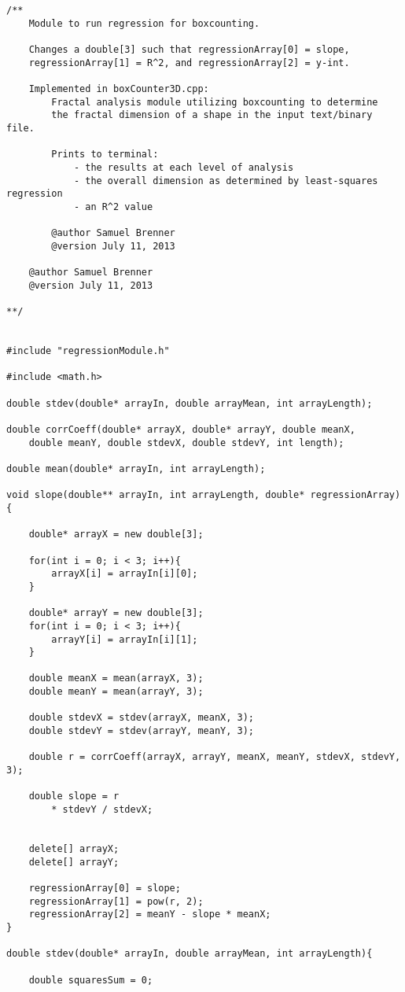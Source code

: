 \begin{lstlisting}
/**
	Module to run regression for boxcounting.
	
	Changes a double[3] such that regressionArray[0] = slope,
	regressionArray[1] = R^2, and regressionArray[2] = y-int.

	Implemented in boxCounter3D.cpp:
		Fractal analysis module utilizing boxcounting to determine 
		the fractal dimension of a shape in the input text/binary file.

		Prints to terminal:
			- the results at each level of analysis
			- the overall dimension as determined by least-squares regression
			- an R^2 value
			
		@author Samuel Brenner
		@version July 11, 2013

	@author Samuel Brenner
	@version July 11, 2013

**/


#include "regressionModule.h"

#include <math.h>

double stdev(double* arrayIn, double arrayMean, int arrayLength);

double corrCoeff(double* arrayX, double* arrayY, double meanX, 
	double meanY, double stdevX, double stdevY, int length);

double mean(double* arrayIn, int arrayLength);

void slope(double** arrayIn, int arrayLength, double* regressionArray){
	
	double* arrayX = new double[3];

	for(int i = 0; i < 3; i++){
		arrayX[i] = arrayIn[i][0];
	}

	double* arrayY = new double[3];
	for(int i = 0; i < 3; i++){
		arrayY[i] = arrayIn[i][1];
	}

	double meanX = mean(arrayX, 3);
	double meanY = mean(arrayY, 3);

	double stdevX = stdev(arrayX, meanX, 3);
	double stdevY = stdev(arrayY, meanY, 3);

	double r = corrCoeff(arrayX, arrayY, meanX, meanY, stdevX, stdevY, 3);

	double slope = r 
		* stdevY / stdevX;


	delete[] arrayX;
	delete[] arrayY;

	regressionArray[0] = slope;
	regressionArray[1] = pow(r, 2);
	regressionArray[2] = meanY - slope * meanX;
}

double stdev(double* arrayIn, double arrayMean, int arrayLength){

	double squaresSum = 0;


\end{lstlisting}
